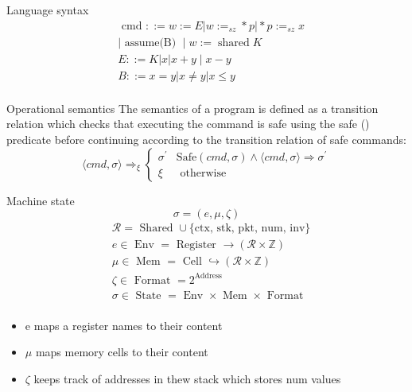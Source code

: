 \documentclass[aspectratio=169]{beamer}
\begin{document}
\begin{frame}{Language syntax}
  $$
    \begin{aligned}
       & \text { cmd }::=w:=E\left|w:=_{s z} * p\right| * p:=_{s z} x \\
       & \mid \text { assume(B) } \mid w:=\operatorname{shared} K     \\
       & E::=K|x| x+y \mid x-y                                        \\
       & B ::=x=y|x \neq y| x \leq y                                  \\
       &
    \end{aligned}
  $$
\end{frame}

\begin{frame}{Operational semantics}
  The semantics of a program is defined as a transition relation which checks that executing the command is safe using the safe () predicate before continuing according to the transition relation of safe commands:
  $$
    \langle c m d, \sigma\rangle \Rightarrow_{\xi} \begin{cases}\sigma^{\prime} & \mathrm{Safe}(c m d, \sigma) \wedge\langle c m d, \sigma\rangle \Rightarrow \sigma^{\prime} \\ \xi & \text { otherwise }\end{cases}
  $$
\end{frame}

\begin{frame}{Machine state}
  $$\sigma = (e, \mu, \zeta)$$
  $$
    \begin{aligned}
       & \mathcal{R}=\text { Shared } \cup\{\text {ctx, stk, pkt, num, inv}\}                  \\
       & e \in \text { Env } =\text { Register } \rightarrow(\mathcal{R} \times \mathbb{Z})    \\
       & \mu \in \text { Mem } =\text { Cell } \hookrightarrow(\mathcal{R} \times \mathbb{Z})  \\
       & \zeta \in \text { Format }=2^{\text {Address }}                                       \\
       & \sigma \in \text { State }=\text { Env } \times \text { Mem } \times \text { Format } \\
       &
    \end{aligned}
  $$
  \begin{itemize}
    \item e maps a register names to their content
    \item $\mu$ maps memory cells to their content
    \item $\zeta$ keeps track of addresses in thew stack which stores num values
  \end{itemize}

\end{frame}
\end{document}
